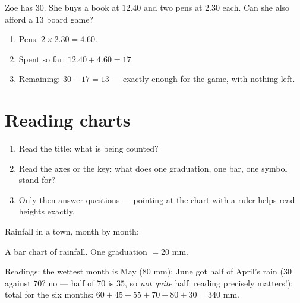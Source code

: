 \begin{example}\label{ex:g5:data:budget}
Zoe has $30$. She buys a book at $12.40$ and two pens at $2.30$
each. Can she also afford a $13$ board game?
\begin{enumerate}
  \item Pens: $2 \times 2.30 = 4.60$.
  \item Spent so far: $12.40 + 4.60 = 17$.
  \item Remaining: $30 - 17 = 13$ --- exactly enough for the game,
        with nothing left.
\end{enumerate}
\end{example}

\section{Reading charts}

\begin{method}\label{met:g5:data:read}
\begin{enumerate}
  \item Read the title: what is being counted?
  \item Read the axes or the key: what does one graduation, one bar,
        one symbol stand for?
  \item Only then answer questions --- pointing at the chart with a
        ruler helps read heights exactly.
\end{enumerate}
\end{method}

\begin{example}\label{ex:g5:data:chart}
Rainfall in a town, month by month:

\begin{omfigure}

{\small A bar chart of rainfall. One graduation $= 20$ mm.}
\end{omfigure}

Readings: the wettest month is May ($80$ mm); June got half of
April's rain ($30$ against $70$? no --- half of $70$ is $35$, so
\emph{not quite} half: reading precisely matters!); total for the
six months: $60 + 45 + 55 + 70 + 80 + 30 = 340$ mm.
\end{example}

